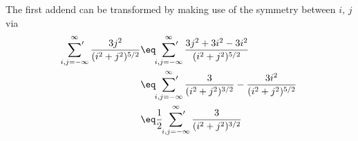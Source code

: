 \documentclass[\main/dresen_thesis.tex]{subfiles}
\begin{document}
  The first addend can be transformed by making use of the symmetry between $i,\,j$ via
  \begin{align}
    \sideset{}{'}\sum_{i,j=-\infty}^\infty \frac{3j^2}{(i^2 + j^2)^{5/2}} \eq& \sideset{}{'}\sum_{i,j=-\infty}^\infty \frac{3j^2 + 3i^2 - 3i^2}{(i^2 + j^2)^{5/2}}\\
    \eq& \sideset{}{'}\sum_{i,j=-\infty}^\infty \frac{3}{(i^2 + j^2)^{3/2}} - \frac{3 i^2}{(i^2 + j^2)^{5/2}} \\
    \eq& \frac{1}{2} \sideset{}{'}\sum_{i,j=-\infty}^\infty \frac{3}{(i^2 + j^2)^{3/2}}
  \end{align}
\end{document}
